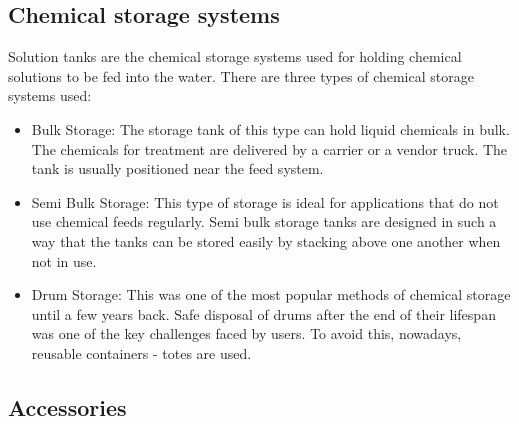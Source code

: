 \subsection {Chemical storage systems}
Solution tanks are the chemical storage systems used for holding chemical solutions to be fed into the water. There are three types of chemical storage systems used:
\begin{itemize}
\item Bulk Storage: The storage tank of this type can hold liquid chemicals in bulk. The chemicals for treatment are delivered by a carrier or a vendor truck. The tank is usually positioned near the feed system.
\item Semi Bulk Storage: This type of storage is ideal for applications that do not use chemical feeds regularly. Semi bulk storage tanks are designed in such a way that the tanks can be stored easily by stacking above one another when not in use.
\item Drum Storage: This was one of the most popular methods of chemical storage until a few years back. Safe disposal of drums after the end of their lifespan was one of the key challenges faced by users. To avoid this, nowadays, reusable containers - totes are used.
\end{itemize}

\subsection{Accessories}

